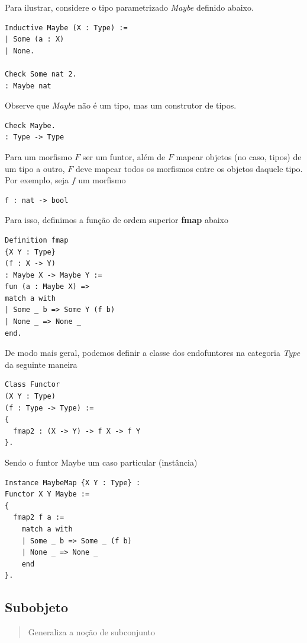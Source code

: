 Para ilustrar, considere o tipo parametrizado \emph{Maybe} definido
abaixo.

\begin{verbatim}
Inductive Maybe (X : Type) :=
| Some (a : X)
| None.

Check Some nat 2.
: Maybe nat
\end{verbatim}

Observe que \emph{Maybe} não é um tipo, mas um construtor de tipos.

\begin{verbatim}
Check Maybe.
: Type -> Type
\end{verbatim}

Para um morfismo \(F\) ser um funtor, além de \(F\) mapear objetos (no
caso, tipos) de um tipo a outro, \(F\) deve mapear todos os morfismos
entre os objetos daquele tipo. Por exemplo, seja \(f\) um morfismo

\begin{verbatim}
f : nat -> bool
\end{verbatim}

Para isso, definimos a função de ordem superior \textbf{fmap} abaixo

\begin{verbatim}
Definition fmap 
{X Y : Type}
(f : X -> Y)
: Maybe X -> Maybe Y :=
fun (a : Maybe X) =>
match a with
| Some _ b => Some Y (f b)
| None _ => None _
end.
\end{verbatim}

De modo mais geral, podemos definir a classe dos endofuntores na
categoria \emph{Type} da seguinte maneira

\begin{verbatim}
Class Functor
(X Y : Type)
(f : Type -> Type) :=
{
  fmap2 : (X -> Y) -> f X -> f Y
}.
\end{verbatim}

Sendo o funtor Maybe um caso particular (instância)

\begin{verbatim}
Instance MaybeMap {X Y : Type} : 
Functor X Y Maybe :=
{
  fmap2 f a := 
    match a with
    | Some _ b => Some _ (f b)
    | None _ => None _
    end
}.
\end{verbatim}

\hypertarget{subobjeto}{%
\subsection{Subobjeto}\label{subobjeto}}

\begin{quote}
Generaliza a noção de subconjunto
\end{quote}

